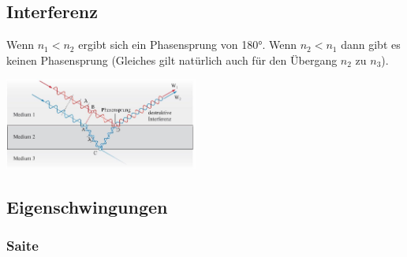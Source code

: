 \subsection{Interferenz}
\begin{center}
	\begin{minipage}{0.25\textwidth}
		Wenn $n_1 < n_2$ ergibt sich ein Phasensprung von 180°. Wenn $n_2 < n_1$ dann gibt es keinen Phasensprung (Gleiches gilt natürlich auch für den Übergang $n_2 $ zu $n_3$).
	\end{minipage}%
	\begin{minipage}{0.25\textwidth}
		\includegraphics[height=3cm,right,keepaspectratio=true]{Images/wellen_interferenz.png}
	\end{minipage}
\end{center}




\subsection{Eigenschwingungen}
\subsubsection{Saite}

